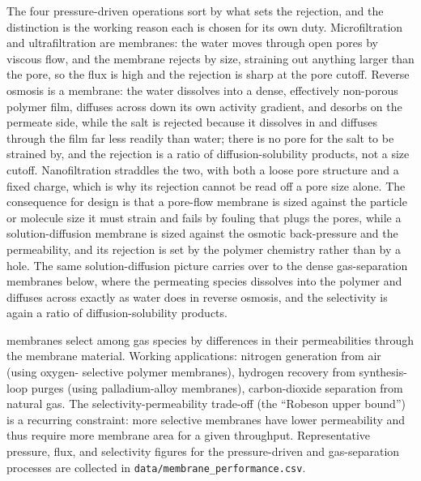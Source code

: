 The four pressure-driven operations sort by what sets the rejection, and the
distinction is the working reason each is chosen for its own duty. Microfiltration
and ultrafiltration are  membranes: the water moves through
open pores by viscous flow, and the membrane rejects by size, straining out
anything larger than the pore, so the flux is high and the rejection is sharp at
the pore cutoff. Reverse osmosis is a  membrane: the
water dissolves into a dense, effectively non-porous polymer film, diffuses
across down its own activity gradient, and desorbs on the permeate side, while
the salt is rejected because it dissolves in and diffuses through the film far
less readily than water; there is no pore for the salt to be strained by, and
the rejection is a ratio of diffusion-solubility products, not a size cutoff.
Nanofiltration straddles the two, with both a loose pore structure and a fixed
charge, which is why its rejection cannot be read off a pore size alone. The
consequence for design is that a pore-flow membrane is sized against the
particle or molecule size it must strain and fails by fouling that plugs the
pores, while a solution-diffusion membrane is sized against the osmotic
back-pressure and the permeability, and its rejection is set by the polymer
chemistry rather than by a hole. The same solution-diffusion picture carries
over to the dense gas-separation membranes below, where the permeating species
dissolves into the polymer and diffuses across exactly as water does in reverse
osmosis, and the selectivity is again a ratio of diffusion-solubility products.

 membranes select among gas species by
differences in their permeabilities through the membrane material.
Working applications: nitrogen generation from air (using oxygen-
selective polymer membranes), hydrogen recovery from synthesis-loop
purges (using palladium-alloy membranes), carbon-dioxide separation
from natural gas. The selectivity-permeability trade-off (the
``Robeson upper bound'') is a recurring constraint: more selective
membranes have lower permeability and thus require more membrane
area for a given throughput. Representative pressure, flux, and
selectivity figures for the pressure-driven and gas-separation
processes are collected in \texttt{data/membrane\_performance.csv}.

